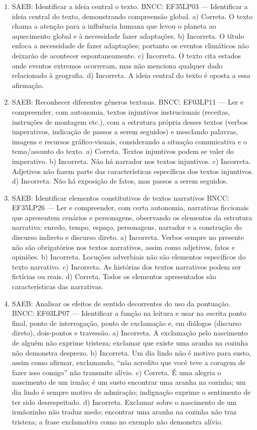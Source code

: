 \begin{enumerate}
\item
SAEB: Identificar a ideia central o texto. BNCC: EF35LP03 --- Identificar a ideia central do texto, demonstrando compreensão global. a) Correta. O texto chama a atenção para a influência humana que levou o planeta ao aquecimento global e à necessidade fazer adaptações. b) Incorreta. O título enfoca a necessidade de fazer adaptações; portanto os eventos climáticos não deixarão de acontecer espontaneamente. c) Incorreta. O texto cita estados onde eventos extremos ocorreram, mas não menciona qualquer dado relacionado à geografia. d) Incorreta. A ideia central do texto é oposta a essa afirmação.

\item
SAEB: Reconhecer diferentes gêneros textuais. BNCC: EF03LP11 --- Ler e compreender, com autonomia, textos injuntivos instrucionais (receitas, instruções de montagem etc.), com a estrutura própria desses textos (verbos imperativos, indicação de passos a serem seguidos) e mesclando palavras, imagens e recursos gráfico-visuais, considerando a situação comunicativa e o tema/assunto do texto. a) Correta. Textos injuntivos podem se valer do imperativo. b) Incorreta. Não há narrador nos textos injuntivos. c) Incorreta. Adjetivos não fazem parte das características específicas dos textos injuntivos. d) Incorreta. Não há exposição de fatos, mas passos a serem seguidos.

\item
SAEB: Identificar elementos constitutivos de textos narrativos BNCC: EF35LP26 --- Ler e compreender, com certa autonomia, narrativas ficcionais que apresentem cenários e personagens, observando os elementos da estrutura narrativa: enredo, tempo, espaço, personagens, narrador e a construção do discurso indireto e discurso direto. a) Incorreta. Verbos sempre no presente não são obrigatórios nos textos narrativos, assim como adjetivos, fatos e opiniões. b) Incorreta. Locuções adverbiais não são elementos específicos do texto narrativo. c) Incorreta. As histórias dos textos narrativos podem ser fictícias ou reais. d) Correta. Todos os elementos apresentados são características das narrativas.

\item
SAEB: Analisar os efeitos de sentido decorrentes do uso da pontuação. BNCC: EF03LP07 --- Identificar a função na leitura e usar na escrita ponto final, ponto de interrogação, ponto de exclamação e, em diálogos (discurso direto), dois-pontos e travessão. a) Incorreta. A exclamação pelo nascimento de alguém não exprime tristeza; exclamar que existe uma aranha na cozinha não demonstra desprezo. b) Incorreta. Um dia lindo não é motivo para susto, assim como afirmar, exclamando, ``não acredito que você teve a coragem de fazer isso comigo'' não transmite alívio. c) Correta. É uma alegria o nascimento de um irmão; é um susto encontrar uma aranha na cozinha; um dia lindo é sempre motivo de admiração; indignação exprime o sentimento de ter sido desrespeitado. d) Incorreta. Exclamar sobre o nascimento de um irmãozinho não traduz medo; encontrar uma aranha na cozinha não traz tristeza; a frase exclamativa como no exemplo não demonstra alívio.


\end{enumerate}
